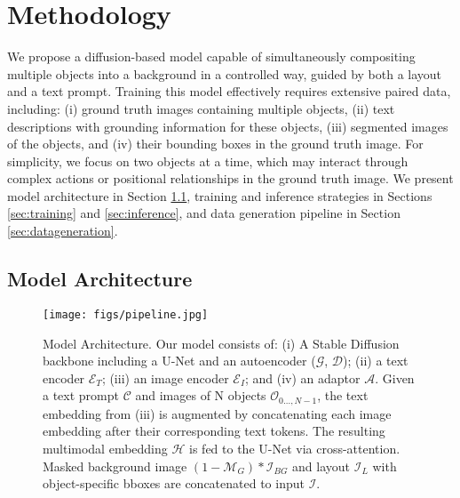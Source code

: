\section{Methodology}
\label{sec:methodology}

We propose a diffusion-based model capable of simultaneously compositing multiple objects into a background in a controlled way, guided by both a layout and a text prompt. Training this model effectively requires extensive paired data, including: (i) ground truth images containing multiple objects, (ii) text descriptions with grounding information for these objects, (iii) segmented images of the objects, and (iv) their bounding boxes in the ground truth image. For simplicity, we focus on two objects at a time, which may interact through complex actions or positional relationships in the ground truth image. We present model architecture  in Section \ref{sec:model}, training and inference strategies in Sections \ref{sec:training} and \ref{sec:inference}, and data generation pipeline in Section \ref{sec:datageneration}.  %

\subsection{Model Architecture}
\label{sec:model}

\begin{figure}[t]
    \centering
    \texttt{[image: figs/pipeline.jpg]}
    \caption{Model Architecture. Our model consists of: (i) A Stable Diffusion backbone including a U-Net and an autoencoder ($\mathcal{G}$, $\mathcal{D}$); (ii) a text encoder $\mathcal{E}_{T}$; (iii) an image encoder $\mathcal{E}_{I}$; and (iv) an adaptor $\mathcal{A}$. Given a text prompt $\mathcal{C}$ and images of N objects $\mathcal{O}_{0\dots, N-1}$, the text embedding from (iii) is augmented by concatenating each image embedding after their corresponding text tokens. The resulting multimodal embedding $\mathcal{H}$ is fed to the U-Net via cross-attention. Masked background image $(1-\mathcal{M}_{G})*\mathcal{I}_{BG}$ and layout $\mathcal{I}_{L}$ with object-specific bboxes are concatenated to input $\mathcal{I}$. }
    \label{fig:pipeline}
    \vspace{-6mm}
\end{figure}

